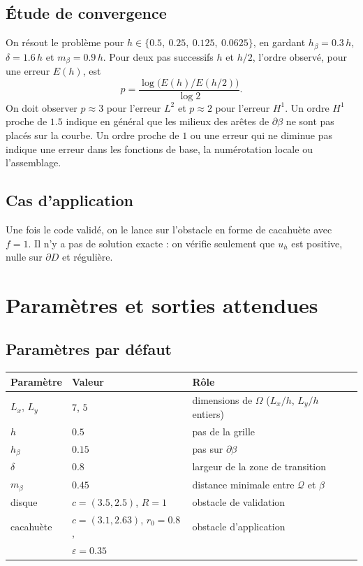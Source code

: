 \documentclass[11pt,a4paper]{article}
\begin{document}
\subsection{Étude de convergence}

On résout le problème pour $h \in \{0.5,\ 0.25,\ 0.125,\ 0.0625\}$, en
gardant $h_\beta = 0.3\,h$, $\delta = 1.6\,h$ et $m_\beta = 0.9\,h$. Pour deux
pas successifs $h$ et $h/2$, l'ordre observé, pour une erreur $E(h)$, est
\[
p = \frac{\log\big(E(h) / E(h/2)\big)}{\log 2} .
\]
On doit observer $p \approx 3$ pour l'erreur $L^2$ et $p \approx 2$ pour
l'erreur $H^1$. Un ordre $H^1$ proche de $1.5$ indique en général que les
milieux des arêtes de $\partial\beta$ ne sont pas placés sur la courbe. Un
ordre proche de $1$ ou une erreur qui ne diminue pas indique une erreur
dans les fonctions de base, la numérotation locale ou l'assemblage.

\subsection{Cas d'application}

Une fois le code validé, on le lance sur l'obstacle en forme de cacahuète
avec $f = 1$. Il n'y a pas de solution exacte : on vérifie seulement que
$u_h$ est positive, nulle sur $\partial D$ et régulière.

\section{Paramètres et sorties attendues}

\subsection{Paramètres par défaut}
\label{sec:parametres}

\begin{center}
\begin{tabular}{lll}
\hline
Paramètre & Valeur & Rôle \\
\hline
$L_x$, $L_y$     & $7$, $5$     & dimensions de $\Omega$ ($L_x/h$, $L_y/h$ entiers) \\
$h$              & $0.5$        & pas de la grille \\
$h_\beta$        & $0.15$       & pas sur $\partial\beta$ \\
$\delta$         & $0.8$        & largeur de la zone de transition \\
$m_\beta$        & $0.45$       & distance minimale entre $\mathcal{Q}$ et $\beta$ \\
disque           & $c = (3.5, 2.5)$, $R = 1$ & obstacle de validation \\
cacahuète        & $c = (3.1, 2.63)$, $r_0 = 0.8$, & obstacle d'application \\
                 & $\varepsilon = 0.35$ & \\
\hline
\end{tabular}
\end{center}
\end{document}
